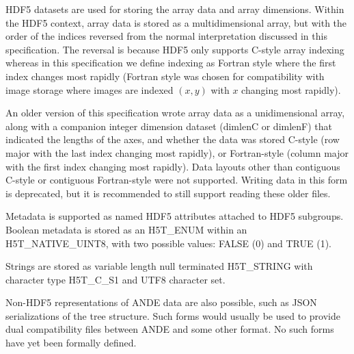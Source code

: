 \documentclass{article}
\begin{document}
HDF5 datasets are used for storing the array data and array dimensions. Within the HDF5 context, array data is stored as a multidimensional array, but with the order of the indices reversed from the normal interpretation discussed in this specification. The reversal is because HDF5 only supports C-style array indexing whereas in this specification we define indexing as Fortran style where the first index changes most rapidly (Fortran style was chosen for compatibility with image storage where images are indexed $(x,y)$ with $x$ changing most rapidly). 

An older version of this specification wrote array data as a unidimensional array, along with a companion integer dimension dataset (dimlenC or dimlenF) that indicated the lengths of the axes, and whether the data was stored C-style (row major with the last index changing most rapidly), or Fortran-style (column major with the first index changing most rapidly). Data layouts other than contiguous C-style or contiguous Fortran-style were not supported. Writing data in this form is deprecated, but it is recommended to still support reading these older files.  

Metadata is supported as named HDF5 attributes attached to HDF5 subgroups.
Boolean metadata is stored as an H5T\_ENUM within an H5T\_NATIVE\_UINT8, with two possible values: FALSE (0) and TRUE (1).

Strings are stored as variable length null terminated H5T\_STRING with character type H5T\_C\_S1 and UTF8 character set.

Non-HDF5 representations of ANDE data are also possible, such as JSON serializations of the tree structure. Such forms would usually be used to provide dual compatibility files between ANDE and some other format. No such forms have yet been formally defined.
\end{document}
